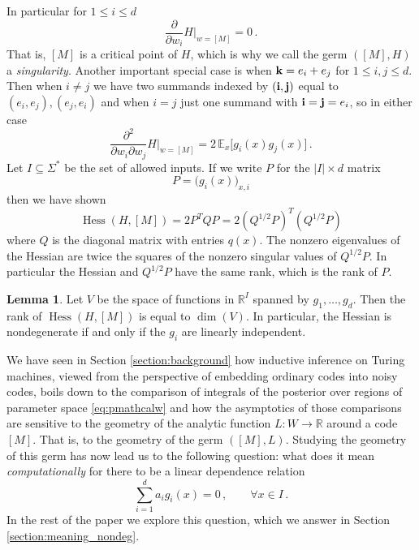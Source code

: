 \documentclass[english,letter paper,12pt,reqno]{article}
\theoremstyle{definition}
\newtheorem{lemma}[theorem]{Lemma}
\newcommand{\lto}{\longrightarrow}
\begin{document}
In particular for $1 \le i \le d$
\[
\frac{\partial}{\partial w_i} H\Bigr|_{w = [M]} = 0\,.
\]
That is, $[M]$ is a critical point of $H$, which is why we call the germ $([M], H)$ a \emph{singularity}. Another important special case is when $\bold{k} = e_i + e_j$ for $1 \le i, j \le d$. Then when $i \neq j$ we have two summands indexed by $(\bold{i}, \bold{j})$ equal to $(e_i, e_j), (e_j, e_i)$ and when $i = j$ just one summand with $\bold{i} = \bold{j} = e_i$, so in either case
\begin{equation}
\frac{\partial^2}{ \partial w_i \partial w_j} H \Bigr|_{w = [M]} = 2\, \mathbb{E}_x\Big[ g_i(x) g_j(x) \Big]\,.
\end{equation}
Let $I \subseteq \Sigma^*$ be the set of allowed inputs. If we write $P$ for the $|I| \times d$ matrix
\[
P = \big( g_i(x) \big)_{x, i}
\]
then we have shown
\begin{equation}\label{eq:hessian_formula_P}
\operatorname{Hess}(H, [M]) = 2 P^T Q P = 2 (Q^{1/2} P)^T (Q^{1/2} P)
\end{equation}
where $Q$ is the diagonal matrix with entries $q(x)$. The nonzero eigenvalues of the Hessian are twice the squares of the nonzero singular values of $Q^{1/2} P$. In particular the Hessian and $Q^{1/2} P$ have the same rank, which is the rank of $P$.

\begin{lemma}\label{lemma:slt25} Let $V$ be the space of functions in $\mathbb{R}^I$ spanned by $g_1,\ldots,g_d$. Then the rank of $\operatorname{Hess}(H, [M])$ is equal to $\dim(V)$. In particular, the Hessian is nondegenerate if and only if the $g_i$ are linearly independent.
\end{lemma}



We have seen in Section \ref{section:background} how inductive inference on Turing machines, viewed from the perspective of embedding ordinary codes into noisy codes, boils down to the comparison of integrals of the posterior over regions of parameter space \eqref{eq:pmathcalw} and how the asymptotics of those comparisons are sensitive to the geometry of the analytic function $L: W \lto \mathbb{R}$ around a code $[M]$. That is, to the geometry of the germ $([M], L)$. Studying the geometry of this germ has now lead us to the following question: what does it mean \emph{computationally} for there to be a linear dependence relation
\begin{equation}
\sum_{i=1}^d a_i g_i(x) = 0\,, \qquad \forall x \in I\,.
\end{equation}
In the rest of the paper we explore this question, which we answer in Section \ref{section:meaning_nondeg}.
\end{document}
